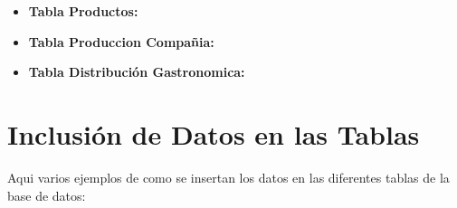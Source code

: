 \documentclass[11pt]{report}
\begin{document}
\begin{itemize}
      \item \textbf{Tabla Productos:}
            \lstset{style=mystyle}
            

      \item \textbf{Tabla Produccion Compañia:}
            \lstset{style=mystyle}
            

      \item \textbf{Tabla Distribución Gastronomica:}
            \lstset{style=mystyle}
            
\end{itemize}

\section{Inclusión de Datos en las Tablas}
Aqui varios ejemplos de como se insertan los datos en las diferentes tablas de la base de datos:
\lstset{style=mystyle}


\newpage
\end{document}
